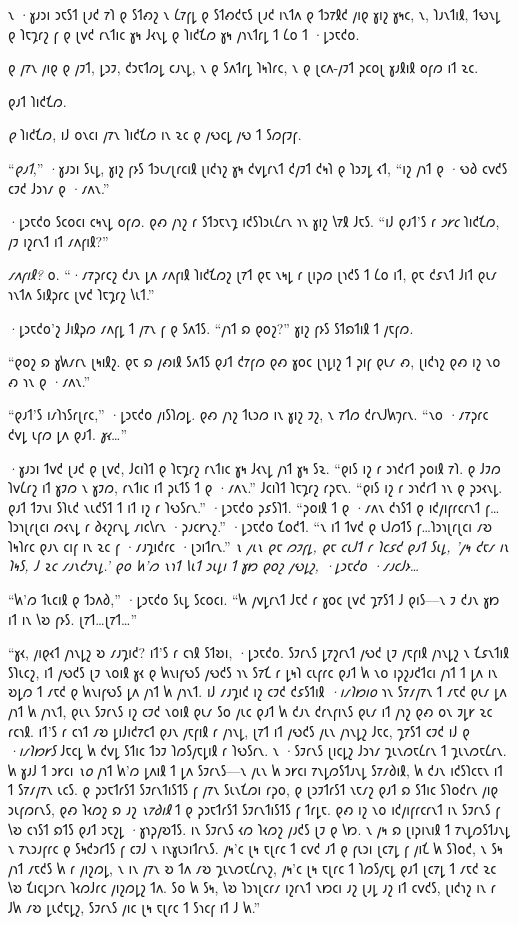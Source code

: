 𐑯 ·𐑣𐑨𐑮𐑦 𐑮𐑱𐑕𐑑 𐑚𐑨𐑒 𐑳𐑐 𐑞 𐑕𐑑𐑺𐑟 𐑯 𐑖𐑳𐑝𐑛 𐑞 𐑕𐑑𐑺𐑒𐑱𐑕 𐑚𐑨𐑒 𐑦𐑯𐑑𐑵 𐑞 𐑑𐑮𐑳𐑙𐑒 𐑢𐑦𐑞 𐑣𐑦𐑟 𐑣𐑰𐑤, 𐑯, 𐑐𐑨𐑯𐑑𐑦𐑙, 𐑑𐑻𐑯𐑛 𐑞 𐑐𐑱𐑡𐑩𐑟 𐑝 𐑞 𐑚𐑫𐑒 𐑩𐑯𐑑𐑦𐑤 𐑣𐑰 𐑓𐑬𐑯𐑛 𐑞 𐑐𐑦𐑒𐑗𐑼 𐑣𐑰 𐑢𐑪𐑯𐑑𐑩𐑛 𐑑 𐑖𐑴 𐑑 ·𐑛𐑮𐑱𐑒𐑴.

𐑞 𐑢𐑳𐑯 𐑢𐑦𐑞 𐑞 𐑢𐑲𐑑, 𐑛𐑮𐑲, 𐑒𐑮𐑱𐑑𐑼𐑛 𐑤𐑨𐑯𐑛, 𐑯 𐑞 𐑕𐑵𐑑𐑩𐑛 𐑐𐑰𐑐𐑩𐑤, 𐑯 𐑞 𐑚𐑤𐑵-𐑢𐑲𐑑 𐑜𐑤𐑴𐑚 𐑣𐑨𐑙𐑦𐑙 𐑴𐑝𐑼 𐑦𐑑 𐑷𐑤.

𐑞𐑨𐑑 𐑐𐑦𐑒𐑗𐑼.

\emph{𐑞} 𐑐𐑦𐑒𐑗𐑼, 𐑦𐑓 𐑴𐑯𐑤𐑦 𐑢𐑳𐑯 𐑐𐑦𐑒𐑗𐑼 𐑦𐑯 𐑷𐑤 𐑞 𐑢𐑻𐑤𐑛 𐑢𐑻 𐑑 𐑕𐑼𐑝𐑲𐑝.

“\emph{𐑞𐑨𐑑},” ·𐑣𐑨𐑮𐑦 𐑕𐑧𐑛, 𐑣𐑦𐑟 𐑝𐑶𐑕 𐑑𐑮𐑧𐑥𐑚𐑩𐑤𐑦𐑙 𐑚𐑦𐑒𐑪𐑟 𐑣𐑰 𐑒𐑫𐑛𐑩𐑯𐑑 𐑒𐑢𐑲𐑑 𐑒𐑰𐑐 𐑞 𐑐𐑮𐑲𐑛 𐑬𐑑, “𐑦𐑟 𐑢𐑪𐑑 𐑞 ·𐑻𐑔 𐑤𐑫𐑒𐑕 𐑤𐑲𐑒 𐑓𐑮𐑪𐑥 𐑞 ·𐑥𐑵𐑯.”

·𐑛𐑮𐑱𐑒𐑴 𐑕𐑤𐑴𐑤𐑦 𐑤𐑰𐑯𐑛 𐑴𐑝𐑼. 𐑞𐑺 𐑢𐑪𐑟 𐑩 𐑕𐑑𐑮𐑱𐑯𐑡 𐑦𐑒𐑕𐑐𐑮𐑧𐑖𐑩𐑯 𐑪𐑯 𐑣𐑦𐑟 𐑘𐑳𐑙 𐑓𐑱𐑕. “𐑦𐑓 𐑞𐑨𐑑'𐑕 𐑩 \emph{𐑮𐑾𐑤} 𐑐𐑦𐑒𐑗𐑼, 𐑢𐑲 𐑦𐑟𐑩𐑯𐑑 𐑦𐑑 𐑥𐑵𐑝𐑦𐑙?”

\emph{𐑥𐑵𐑝𐑦𐑙?} 𐑴. “·𐑥𐑳𐑜𐑩𐑤𐑟 𐑒𐑨𐑯 𐑛𐑵 𐑥𐑵𐑝𐑦𐑙 𐑐𐑦𐑒𐑗𐑼𐑟 𐑚𐑳𐑑 𐑞𐑱 𐑯𐑰𐑛 𐑩 𐑚𐑦𐑜𐑼 𐑚𐑪𐑒𐑕 𐑑 𐑖𐑴 𐑦𐑑, 𐑞𐑱 𐑒𐑭𐑯𐑑 𐑓𐑦𐑑 𐑞𐑧𐑥 𐑪𐑯𐑑𐑵 𐑕𐑦𐑙𐑜𐑩𐑤 𐑚𐑫𐑒 𐑐𐑱𐑡𐑩𐑟 𐑘𐑧𐑑.”

·𐑛𐑮𐑱𐑒𐑴'𐑟 𐑓𐑦𐑙𐑜𐑼 𐑥𐑵𐑝𐑛 𐑑 𐑢𐑳𐑯 𐑝 𐑞 𐑕𐑵𐑑𐑕. “𐑢𐑪𐑑 𐑸 𐑞𐑴𐑟?” 𐑣𐑦𐑟 𐑝𐑶𐑕 𐑕𐑑𐑸𐑑𐑦𐑙 𐑑 𐑢𐑱𐑝𐑼.

“𐑞𐑴𐑟 𐑸 𐑣𐑿𐑥𐑩𐑯 𐑚𐑰𐑦𐑙𐑟. 𐑞𐑱 𐑸 𐑢𐑺𐑦𐑙 𐑕𐑵𐑑𐑕 𐑞𐑨𐑑 𐑒𐑳𐑝𐑼 𐑞𐑺 𐑣𐑴𐑤 𐑚𐑪𐑛𐑦𐑟 𐑑 𐑜𐑦𐑝 𐑞𐑧𐑥 𐑺, 𐑚𐑦𐑒𐑪𐑟 𐑞𐑺 𐑦𐑟 𐑯𐑴 𐑺 𐑪𐑯 𐑞 ·𐑥𐑵𐑯.”

“𐑞𐑨𐑑'𐑕 𐑦𐑥𐑐𐑪𐑕𐑩𐑚𐑩𐑤,” ·𐑛𐑮𐑱𐑒𐑴 𐑢𐑦𐑕𐑐𐑼𐑛. 𐑞𐑺 𐑢𐑪𐑟 𐑑𐑧𐑮𐑼 𐑦𐑯 𐑣𐑦𐑟 𐑲𐑟, 𐑯 𐑳𐑑𐑼 𐑒𐑩𐑯𐑓𐑿𐑠𐑩𐑯. “𐑯𐑴 ·𐑥𐑳𐑜𐑩𐑤 𐑒𐑫𐑛 𐑧𐑝𐑼 𐑛𐑵 𐑞𐑨𐑑. \emph{𐑣𐑬…}”

·𐑣𐑨𐑮𐑦 𐑑𐑫𐑒 𐑚𐑨𐑒 𐑞 𐑚𐑫𐑒, 𐑓𐑤𐑦𐑐𐑑 𐑞 𐑐𐑱𐑡𐑩𐑟 𐑩𐑯𐑑𐑦𐑤 𐑣𐑰 𐑓𐑬𐑯𐑛 𐑢𐑪𐑑 𐑣𐑰 𐑕𐑷. “𐑞𐑦𐑕 𐑦𐑟 𐑩 𐑮𐑪𐑒𐑩𐑑 𐑜𐑴𐑦𐑙 𐑳𐑐. 𐑞 𐑓𐑲𐑼 𐑐𐑫𐑖𐑩𐑟 𐑦𐑑 𐑣𐑲𐑼 𐑯 𐑣𐑲𐑼, 𐑩𐑯𐑑𐑦𐑤 𐑦𐑑 𐑜𐑧𐑑𐑕 𐑑 𐑞 ·𐑥𐑵𐑯.” 𐑓𐑤𐑦𐑐𐑑 𐑐𐑱𐑡𐑩𐑟 𐑩𐑜𐑱𐑯. “𐑞𐑦𐑕 𐑦𐑟 𐑩 𐑮𐑪𐑒𐑩𐑑 𐑪𐑯 𐑞 𐑜𐑮𐑬𐑯𐑛. 𐑞𐑨𐑑 𐑑𐑲𐑯𐑦 𐑕𐑐𐑧𐑒 𐑯𐑧𐑒𐑕𐑑 𐑑 𐑦𐑑 𐑦𐑟 𐑩 𐑐𐑻𐑕𐑩𐑯.” ·𐑛𐑮𐑱𐑒𐑴 𐑜𐑭𐑕𐑐𐑑. “𐑜𐑴𐑦𐑙 𐑑 𐑞 ·𐑥𐑵𐑯 𐑒𐑪𐑕𐑑 𐑞 𐑦𐑒𐑢𐑦𐑝𐑩𐑤𐑩𐑯𐑑 𐑝…𐑐𐑮𐑪𐑚𐑩𐑚𐑤𐑦 𐑼𐑬𐑯𐑛 𐑩 𐑔𐑬𐑟𐑩𐑯𐑛 𐑥𐑦𐑤𐑘𐑩𐑯 ·𐑜𐑨𐑤𐑾𐑯𐑟.” ·𐑛𐑮𐑱𐑒𐑴 𐑗𐑴𐑒𐑑. “𐑯 𐑦𐑑 𐑑𐑫𐑒 𐑞 𐑧𐑓𐑼𐑑𐑕 𐑝…𐑐𐑮𐑪𐑚𐑩𐑚𐑤𐑦 𐑥𐑹 𐑐𐑰𐑐𐑩𐑤 𐑞𐑨𐑯 𐑤𐑦𐑝 𐑦𐑯 𐑷𐑤 𐑝 ·𐑥𐑨𐑡𐑦𐑒𐑩𐑤 ·𐑚𐑮𐑦𐑑𐑩𐑯.” \emph{𐑯 𐑢𐑧𐑯 𐑞𐑱 𐑼𐑲𐑝𐑛, 𐑞𐑱 𐑤𐑧𐑓𐑑 𐑩 𐑐𐑤𐑭𐑒 𐑞𐑨𐑑 𐑕𐑧𐑛, '𐑢𐑰 𐑒𐑱𐑥 𐑦𐑯 𐑐𐑰𐑕, 𐑓 𐑷𐑤 𐑥𐑨𐑯𐑒𐑲𐑯𐑛.' 𐑞𐑴 𐑿'𐑼 𐑯𐑪𐑑 𐑘𐑧𐑑 𐑮𐑧𐑛𐑦 𐑑 𐑣𐑽 𐑞𐑴𐑟 𐑢𐑻𐑛𐑟, ·𐑛𐑮𐑱𐑒𐑴 ·𐑥𐑨𐑤𐑓𐑶…}

“𐑿'𐑼 𐑑𐑧𐑤𐑦𐑙 𐑞 𐑑𐑮𐑵𐑔,” ·𐑛𐑮𐑱𐑒𐑴 𐑕𐑧𐑛 𐑕𐑤𐑴𐑤𐑦. “𐑿 𐑢𐑫𐑛𐑩𐑯𐑑 𐑓𐑱𐑒 𐑩 𐑣𐑴𐑤 𐑚𐑫𐑒 𐑡𐑳𐑕𐑑 𐑓 𐑞𐑦𐑕—𐑯 𐑲 𐑒𐑨𐑯 𐑣𐑽 𐑦𐑑 𐑦𐑯 𐑘𐑹 𐑝𐑶𐑕. 𐑚𐑳𐑑…𐑚𐑳𐑑…”

“𐑣𐑬, 𐑢𐑦𐑞𐑬𐑑 𐑢𐑪𐑯𐑛𐑟 𐑹 𐑥𐑨𐑡𐑦𐑒? 𐑦𐑑'𐑕 𐑩 𐑤𐑪𐑙 𐑕𐑑𐑹𐑦, ·𐑛𐑮𐑱𐑒𐑴. 𐑕𐑲𐑩𐑯𐑕 𐑛𐑳𐑟𐑩𐑯𐑑 𐑢𐑻𐑒 𐑚𐑲 𐑢𐑱𐑝𐑦𐑙 𐑢𐑪𐑯𐑛𐑟 𐑯 𐑗𐑭𐑯𐑑𐑦𐑙 𐑕𐑐𐑧𐑤𐑟, 𐑦𐑑 𐑢𐑻𐑒𐑕 𐑚𐑲 𐑯𐑴𐑦𐑙 𐑣𐑬 𐑞 𐑿𐑯𐑦𐑝𐑻𐑕 𐑢𐑻𐑒𐑕 𐑪𐑯 𐑕𐑳𐑗 𐑩 𐑛𐑰𐑐 𐑤𐑧𐑝𐑩𐑤 𐑞𐑨𐑑 𐑿 𐑯𐑴 𐑦𐑜𐑟𐑨𐑒𐑑𐑤𐑦 𐑢𐑪𐑑 𐑑 𐑛𐑵 𐑦𐑯 𐑹𐑛𐑼 𐑑 𐑥𐑱𐑒 𐑞 𐑿𐑯𐑦𐑝𐑻𐑕 𐑛𐑵 𐑢𐑪𐑑 𐑿 𐑢𐑪𐑯𐑑. 𐑦𐑓 𐑥𐑨𐑡𐑦𐑒 𐑦𐑟 𐑤𐑲𐑒 𐑒𐑭𐑕𐑑𐑦𐑙 \emph{·𐑦𐑥𐑐𐑽𐑦𐑴} 𐑪𐑯 𐑕𐑳𐑥𐑢𐑳𐑯 𐑑 𐑥𐑱𐑒 𐑞𐑧𐑥 𐑛𐑵 𐑢𐑪𐑑 𐑿 𐑢𐑪𐑯𐑑, 𐑞𐑧𐑯 𐑕𐑲𐑩𐑯𐑕 𐑦𐑟 𐑤𐑲𐑒 𐑯𐑴𐑦𐑙 𐑞𐑧𐑥 𐑕𐑴 𐑢𐑧𐑤 𐑞𐑨𐑑 𐑿 𐑒𐑨𐑯 𐑒𐑩𐑯𐑝𐑦𐑯𐑕 𐑞𐑧𐑥 𐑦𐑑 𐑢𐑪𐑟 𐑞𐑺 𐑴𐑯 𐑲𐑛𐑾 𐑷𐑤 𐑩𐑤𐑪𐑙. 𐑦𐑑'𐑕 𐑩 𐑤𐑪𐑑 𐑥𐑹 𐑛𐑦𐑓𐑦𐑒𐑳𐑤𐑑 𐑞𐑨𐑯 𐑢𐑱𐑝𐑦𐑙 𐑩 𐑢𐑪𐑯𐑛, 𐑚𐑳𐑑 𐑦𐑑 𐑢𐑻𐑒𐑕 𐑢𐑧𐑯 𐑢𐑪𐑯𐑛𐑟 𐑓𐑱𐑤, 𐑡𐑳𐑕𐑑 𐑤𐑲𐑒 𐑦𐑓 𐑞 \emph{·𐑦𐑥𐑐𐑽𐑾𐑕} 𐑓𐑱𐑤𐑛 𐑿 𐑒𐑫𐑛 𐑕𐑑𐑦𐑤 𐑑𐑮𐑲 𐑐𐑼𐑕𐑢𐑱𐑛𐑦𐑙 𐑩 𐑐𐑻𐑕𐑩𐑯. 𐑯 ·𐑕𐑲𐑩𐑯𐑕 𐑚𐑦𐑤𐑛𐑟 𐑓𐑮𐑪𐑥 𐑡𐑧𐑯𐑼𐑱𐑖𐑩𐑯 𐑑 𐑡𐑧𐑯𐑼𐑱𐑖𐑩𐑯. 𐑿 𐑣𐑨𐑓 𐑑 𐑮𐑾𐑤𐑦 \emph{𐑯𐑴} 𐑢𐑪𐑑 𐑿'𐑼 𐑛𐑵𐑦𐑙 𐑑 𐑛𐑵 𐑕𐑲𐑩𐑯𐑕—𐑯 𐑢𐑧𐑯 𐑿 𐑮𐑾𐑤𐑦 𐑳𐑯𐑛𐑼𐑕𐑑𐑨𐑯𐑛 𐑕𐑳𐑥𐑔𐑦𐑙, 𐑿 𐑒𐑨𐑯 𐑦𐑒𐑕𐑐𐑤𐑱𐑯 𐑦𐑑 𐑑 𐑕𐑳𐑥𐑢𐑳𐑯 𐑧𐑤𐑕. 𐑞 𐑜𐑮𐑱𐑑𐑩𐑕𐑑 𐑕𐑲𐑩𐑯𐑑𐑦𐑕𐑑𐑕 𐑝 𐑢𐑳𐑯 𐑕𐑧𐑯𐑗𐑼𐑦 𐑩𐑜𐑴, 𐑞 𐑚𐑮𐑲𐑑𐑩𐑕𐑑 𐑯𐑱𐑥𐑟 𐑞𐑨𐑑 𐑸 𐑕𐑑𐑦𐑤 𐑕𐑐𐑴𐑒𐑩𐑯 𐑢𐑦𐑞 𐑮𐑧𐑝𐑼𐑩𐑯𐑕, 𐑞𐑺 𐑐𐑬𐑼𐑟 𐑸 𐑨𐑟 \emph{𐑯𐑳𐑔𐑦𐑙} 𐑑 𐑞 𐑜𐑮𐑱𐑑𐑩𐑕𐑑 𐑕𐑲𐑩𐑯𐑑𐑦𐑕𐑑𐑕 𐑝 𐑑𐑩𐑛𐑱. 𐑞𐑺 𐑦𐑟 𐑯𐑴 𐑦𐑒𐑢𐑦𐑝𐑩𐑤𐑩𐑯𐑑 𐑦𐑯 𐑕𐑲𐑩𐑯𐑕 𐑝 𐑘𐑹 𐑤𐑪𐑕𐑑 𐑸𐑑𐑕 𐑞𐑨𐑑 𐑮𐑱𐑟𐑛 ·𐑣𐑪𐑜𐑢𐑹𐑑𐑕. 𐑦𐑯 𐑕𐑲𐑩𐑯𐑕 𐑬𐑼 𐑐𐑬𐑼𐑟 𐑢𐑨𐑒𐑕 𐑚𐑲 𐑞 𐑘𐑽. 𐑯 𐑢𐑰 𐑸 𐑚𐑦𐑜𐑦𐑯𐑦𐑙 𐑑 𐑳𐑯𐑛𐑼𐑕𐑑𐑨𐑯𐑛 𐑯 𐑳𐑯𐑮𐑨𐑝𐑩𐑤 𐑞 𐑕𐑰𐑒𐑮𐑩𐑑𐑕 𐑝 𐑤𐑲𐑓 𐑯 𐑦𐑯𐑣𐑧𐑮𐑦𐑑𐑩𐑯𐑕. 𐑢𐑰'𐑤 𐑚𐑰 𐑱𐑚𐑩𐑤 𐑑 𐑤𐑫𐑒 𐑨𐑑 𐑞 𐑝𐑧𐑮𐑦 𐑚𐑤𐑳𐑛 𐑝 𐑢𐑦𐑗 𐑿 𐑕𐑐𐑴𐑒, 𐑯 𐑕𐑰 𐑢𐑪𐑑 𐑥𐑱𐑒𐑕 𐑿 𐑩 𐑢𐑦𐑟𐑼𐑛, 𐑯 𐑦𐑯 𐑢𐑳𐑯 𐑹 𐑑𐑵 𐑥𐑹 𐑡𐑧𐑯𐑼𐑱𐑖𐑩𐑯𐑟, 𐑢𐑰'𐑤 𐑚𐑰 𐑱𐑚𐑩𐑤 𐑑 𐑐𐑼𐑕𐑢𐑱𐑛 𐑞𐑨𐑑 𐑚𐑤𐑳𐑛 𐑑 𐑥𐑱𐑒 𐑷𐑤 𐑘𐑹 𐑗𐑦𐑤𐑛𐑮𐑩𐑯 𐑐𐑬𐑼𐑓𐑩𐑤 𐑢𐑦𐑟𐑼𐑛𐑟 𐑑𐑵. 𐑕𐑴 𐑿 𐑕𐑰, 𐑘𐑹 𐑐𐑮𐑪𐑚𐑤𐑩𐑥 𐑦𐑟𐑩𐑯𐑑 𐑯𐑽𐑤𐑦 𐑨𐑟 𐑚𐑨𐑛 𐑨𐑟 𐑦𐑑 𐑤𐑫𐑒𐑕, 𐑚𐑦𐑒𐑪𐑟 𐑦𐑯 𐑩 𐑓𐑿 𐑥𐑹 𐑛𐑧𐑒𐑱𐑛𐑟, 𐑕𐑲𐑩𐑯𐑕 𐑢𐑦𐑤 𐑚𐑰 𐑱𐑚𐑩𐑤 𐑑 𐑕𐑪𐑤𐑝 𐑦𐑑 𐑓 𐑿.”

